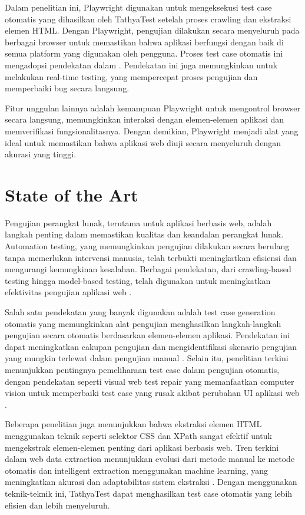 Dalam penelitian ini, Playwright digunakan untuk mengeksekusi test case otomatis yang dihasilkan oleh TathyaTest setelah proses crawling dan ekstraksi elemen HTML. Dengan Playwright, pengujian dilakukan secara menyeluruh pada berbagai browser untuk memastikan bahwa aplikasi berfungsi dengan baik di semua platform yang digunakan oleh pengguna. Proses test case otomatis ini mengadopsi pendekatan dalam \parencite{sahoo2021}. Pendekatan ini juga memungkinkan untuk melakukan real-time testing, yang mempercepat proses pengujian dan memperbaiki bug secara langsung.

Fitur unggulan lainnya adalah kemampuan Playwright untuk mengontrol browser secara langsung, memungkinkan interaksi dengan elemen-elemen aplikasi dan memverifikasi fungsionalitasnya. Dengan demikian, Playwright menjadi alat yang ideal untuk memastikan bahwa aplikasi web diuji secara menyeluruh dengan akurasi yang tinggi.

\section{State of the Art}\label{state-of-the-art}

Pengujian perangkat lunak, terutama untuk aplikasi berbasis web, adalah langkah penting dalam memastikan kualitas dan keandalan perangkat lunak. Automation testing, yang memungkinkan pengujian dilakukan secara berulang tanpa memerlukan intervensi manusia, telah terbukti meningkatkan efisiensi dan mengurangi kemungkinan kesalahan. Berbagai pendekatan, dari crawling-based testing hingga model-based testing, telah digunakan untuk meningkatkan efektivitas pengujian aplikasi web \parencite{wang2023}.

Salah satu pendekatan yang banyak digunakan adalah test case generation otomatis yang memungkinkan alat pengujian menghasilkan langkah-langkah pengujian secara otomatis berdasarkan elemen-elemen aplikasi. Pendekatan ini dapat meningkatkan cakupan pengujian dan mengidentifikasi skenario pengujian yang mungkin terlewat dalam pengujian manual \parencite{setiani2019}. Selain itu, penelitian terkini menunjukkan pentingnya pemeliharaan test case dalam pengujian otomatis, dengan pendekatan seperti visual web test repair yang memanfaatkan computer vision untuk memperbaiki test case yang rusak akibat perubahan UI aplikasi web \parencite{stocco2018}.

Beberapa penelitian juga menunjukkan bahwa ekstraksi elemen HTML menggunakan teknik seperti selektor CSS dan XPath sangat efektif untuk mengekstrak elemen-elemen penting dari aplikasi berbasis web. Tren terkini dalam web data extraction menunjukkan evolusi dari metode manual ke metode otomatis dan intelligent extraction menggunakan machine learning, yang meningkatkan akurasi dan adaptabilitas sistem ekstraksi \parencite{patnaik2021}. Dengan menggunakan teknik-teknik ini, TathyaTest dapat menghasilkan test case otomatis yang lebih efisien dan lebih menyeluruh.

